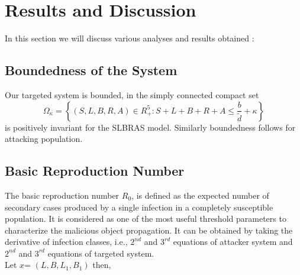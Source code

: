 \documentclass[conference]{IEEEtran}
\begin{document}
%

\section{Results and Discussion}
In this section we will discuss various analyses and results obtained :

\subsection{Boundedness of the System}
Our targeted system is bounded, in the simply connected compact set
\footnotesize \[
\Omega_\kappa =  \left\{(S,L,B,R,A) \in R^5_+ : S+L+B+R+A \leq \frac{b}{\tilde{d}} + \kappa \right\}\]
\normalsize
is positively invariant for the SLBRAS model. Similarly boundedness follows for attacking population.

\subsection{Basic Reproduction Number}
The basic reproduction number $R_{0}$, is defined as the expected number of secondary cases produced by a single infection in a completely susceptible population. It is considered as one of the most useful threshold parameters to characterize the malicious object propagation. It can be obtained by taking the derivative of infection classes, i.e., $2^{nd}$ and $3^{rd}$ equations of attacker system and $2^{nd}$ and $3^{rd}$ equations of targeted system.\\
Let $x$= $(L, B, L_{1}, B_{1})$ then,
\end{document}
